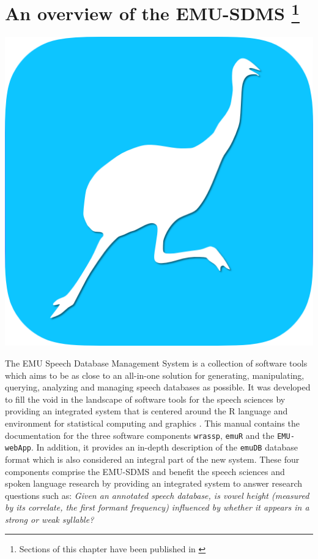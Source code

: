 \documentclass[]{book}
\let\rmarkdownfootnote\footnote%
\def\footnote{\protect\rmarkdownfootnote}
\theoremstyle{definition}
\theoremstyle{definition}
\theoremstyle{definition}
\theoremstyle{remark}
\begin{document}
\chapter[An overview of the EMU-SDMS ]{\texorpdfstring{An overview of
the EMU-SDMS \footnote{Sections of this chapter have been published in
  \citet{winkelmann:2017aa}}}{An overview of the EMU-SDMS }}\label{chap:overview}

\includegraphics[width=14.22in]{pics/EMU-webAppIcon-roundCorners}

The EMU Speech Database Management System is a collection of software
tools which aims to be as close to an all-in-one solution for
generating, manipulating, querying, analyzing and managing speech
databases as possible. It was developed to fill the void in the
landscape of software tools for the speech sciences by providing an
integrated system that is centered around the R language and environment
for statistical computing and graphics \citep{r-core-team:2016a}. This
manual contains the documentation for the three software components
\texttt{wrassp}, \texttt{emuR} and the \texttt{EMU-webApp}. In addition,
it provides an in-depth description of the \texttt{emuDB} database
format which is also considered an integral part of the new system.
These four components comprise the EMU-SDMS and benefit the speech
sciences and spoken language research by providing an integrated system
to answer research questions such as: \emph{Given an annotated speech
database, is vowel height (measured by its correlate, the first formant
frequency) influenced by whether it appears in a strong or weak
syllable?}
\end{document}
